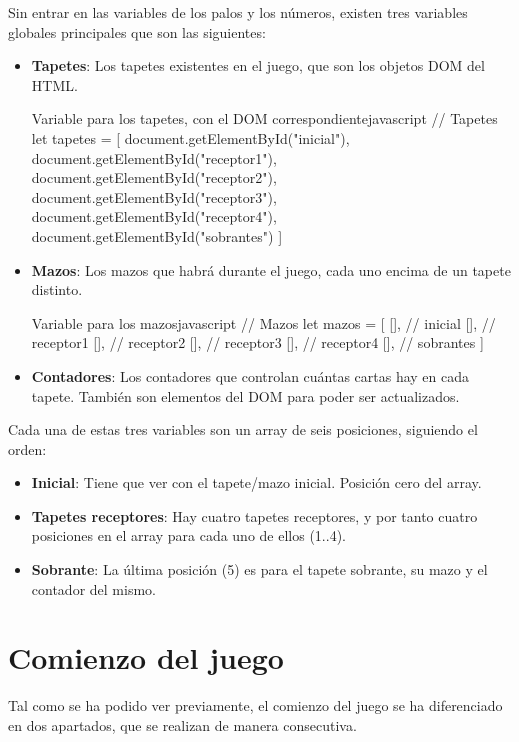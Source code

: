 \documentclass{\ClassPath/viu-tfm-template}
\begin{document}
Sin entrar en las variables de los palos y los números, existen tres variables globales principales que son las siguientes:

\vspace{-1em}
\begin{itemize}
    \item \textbf{Tapetes}: Los tapetes existentes en el juego, que son los objetos DOM del HTML.

\begin{mycode}{Variable para los tapetes, con el DOM correspondiente}{javascript}{}
// Tapetes
let tapetes = [
    document.getElementById("inicial"),
    document.getElementById("receptor1"),
    document.getElementById("receptor2"),
    document.getElementById("receptor3"),
    document.getElementById("receptor4"),
    document.getElementById("sobrantes")
]
\end{mycode}


    \item \textbf{Mazos}: Los mazos que habrá durante el juego, cada uno encima de un tapete distinto.
\begin{mycode}{Variable para los mazos}{javascript}{}
// Mazos
let mazos = [
    [], // inicial
    [], // receptor1
    [], // receptor2
    [], // receptor3
    [], // receptor4
    [], // sobrantes
]
\end{mycode}
    \item \textbf{Contadores}: Los contadores que controlan cuántas cartas hay en cada tapete. También son elementos del DOM para poder ser actualizados.
\end{itemize}
\vspace{-1em}


Cada una de estas tres variables son un array de seis posiciones, siguiendo el orden:

\vspace{-1em}
\begin{itemize}
    \item \textbf{Inicial}: Tiene que ver con el tapete/mazo inicial. Posición cero del array.
    \item \textbf{Tapetes receptores}: Hay cuatro tapetes receptores, y por tanto cuatro posiciones en el array para cada uno de ellos (1..4).
    \item \textbf{Sobrante}: La última posición (5) es para el tapete sobrante, su mazo y el contador del mismo.
\end{itemize}
\vspace{-1em}

\section{Comienzo del juego}
Tal como se ha podido ver previamente, el comienzo del juego se ha diferenciado en dos apartados, que se realizan de manera consecutiva.
\end{document}
